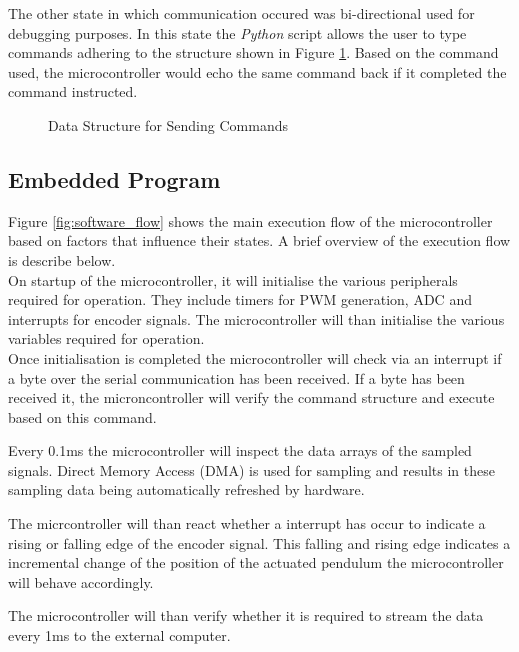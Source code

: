 The other state in which communication occured was bi-directional used for debugging purposes. In this state the \textit{Python} script allows the user to type commands adhering to the structure shown in Figure \ref{fig:uart_struct}. Based on the command used, the microcontroller would echo the same command back if it completed the command instructed.


\begin{figure}[h]
	\centering
	
	\caption{Data Structure for Sending Commands}
	\label{fig:uart_struct}
\end{figure}


\subsection{Embedded Program}


Figure \ref{fig:software_flow} shows the main execution flow of the microcontroller based on factors that influence their states. A brief overview of the execution flow is describe below.\\

On startup of the microcontroller, it will initialise the various peripherals required for operation. They include timers for PWM generation, ADC and interrupts for encoder signals. The microcontroller will than initialise the various variables required for operation.\\

Once initialisation is completed the microcontroller will check via an interrupt if a byte over the serial communication has been received. If a byte has been received it, the microncontroller will verify the command structure and execute based on this command.

Every 0.1ms the microcontroller will inspect the data arrays of the sampled signals. Direct Memory Access (DMA) is used for sampling and results in these sampling data being automatically refreshed by hardware.

The micrcontroller will than react whether a interrupt has occur to indicate a rising or falling edge of the encoder signal. This falling and rising edge indicates a incremental change of the position of the actuated pendulum the microcontroller will behave accordingly.

The microcontroller will than verify whether it is required to stream the data every 1ms to the external computer. 
